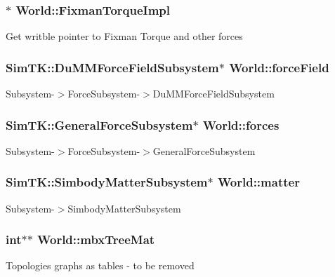 \subsubsection[{\texorpdfstring{Fixman\+Torque\+Impl}{FixmanTorqueImpl}}]{$\ast$ World\+::\+Fixman\+Torque\+Impl}\hypertarget{classWorld_a365134a878260d3e05efc93634b697df}{}\label{classWorld_a365134a878260d3e05efc93634b697df}
Get writble pointer to Fixman Torque and other forces 
\subsubsection[{\texorpdfstring{force\+Field}{forceField}}]{\setlength{\rightskip}{0pt plus 5cm}Sim\+T\+K\+::\+Du\+M\+M\+Force\+Field\+Subsystem$\ast$ World\+::force\+Field}\hypertarget{classWorld_a49e379a00c0f908542349ee979775e8d}{}\label{classWorld_a49e379a00c0f908542349ee979775e8d}
Subsystem-\/$>$Force\+Subsystem-\/$>$Du\+M\+M\+Force\+Field\+Subsystem 
\subsubsection[{\texorpdfstring{forces}{forces}}]{\setlength{\rightskip}{0pt plus 5cm}Sim\+T\+K\+::\+General\+Force\+Subsystem$\ast$ World\+::forces}\hypertarget{classWorld_a25f41543a35f1950cde1e7a70a01d38d}{}\label{classWorld_a25f41543a35f1950cde1e7a70a01d38d}
Subsystem-\/$>$Force\+Subsystem-\/$>$General\+Force\+Subsystem 
\subsubsection[{\texorpdfstring{matter}{matter}}]{\setlength{\rightskip}{0pt plus 5cm}Sim\+T\+K\+::\+Simbody\+Matter\+Subsystem$\ast$ World\+::matter}\hypertarget{classWorld_adc0da6db32a40c1cc09e29f7044ac3e6}{}\label{classWorld_adc0da6db32a40c1cc09e29f7044ac3e6}
Subsystem-\/$>$Simbody\+Matter\+Subsystem 
\subsubsection[{\texorpdfstring{mbx\+Tree\+Mat}{mbxTreeMat}}]{\setlength{\rightskip}{0pt plus 5cm}int$\ast$$\ast$ World\+::mbx\+Tree\+Mat}\hypertarget{classWorld_ae6ee20b37727cb29bbb29fa57e4b4ccc}{}\label{classWorld_ae6ee20b37727cb29bbb29fa57e4b4ccc}
Topologies graphs as tables -\/ to be removed 
